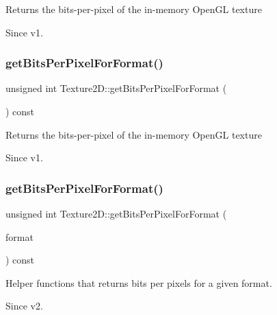Returns the bits-\/per-\/pixel of the in-\/memory Open\+GL texture \begin{DoxySince}{Since}
v1. 
\end{DoxySince}
\mbox{\label{classTexture2D_af29476c171cc5167c8392265f80fb9af}} 
\subsubsection{\texorpdfstring{get\+Bits\+Per\+Pixel\+For\+Format()}{getBitsPerPixelForFormat()}\hspace{0.1cm}{\footnotesize\ttfamily [2/4]}}
{\footnotesize\ttfamily unsigned int Texture2\+D\+::get\+Bits\+Per\+Pixel\+For\+Format (\begin{DoxyParamCaption}{ }\end{DoxyParamCaption}) const}

Returns the bits-\/per-\/pixel of the in-\/memory Open\+GL texture \begin{DoxySince}{Since}
v1. 
\end{DoxySince}
\mbox{\label{classTexture2D_ada259b363b6d48c23acfcc79db3d2a47}} 
\subsubsection{\texorpdfstring{get\+Bits\+Per\+Pixel\+For\+Format()}{getBitsPerPixelForFormat()}\hspace{0.1cm}{\footnotesize\ttfamily [3/4]}}
{\footnotesize\ttfamily unsigned int Texture2\+D\+::get\+Bits\+Per\+Pixel\+For\+Format (\begin{DoxyParamCaption}\item[{\hyperlink{classTexture2D_a45d9d8bb5a0669def36bbdfbfb91d220}{Texture2\+D\+::\+Pixel\+Format}}]{format }\end{DoxyParamCaption}) const}

Helper functions that returns bits per pixels for a given format. \begin{DoxySince}{Since}
v2. 
\end{DoxySince}
\mbox{\label{classTexture2D_ada259b363b6d48c23acfcc79db3d2a47}} 
